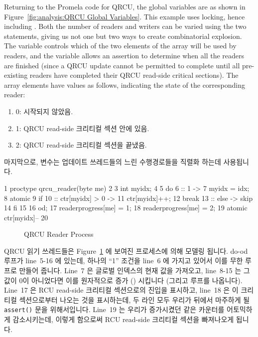 Returning to the Promela code for QRCU, the global variables are as shown in
Figure~\ref{fig:analysis:QRCU Global Variables}.
This example uses locking, hence including .
Both the number of readers and writers can be varied using the
two  statements, giving us not one but two ways to create
combinatorial explosion.
The  variable controls which of the two elements of the 
array will be used by readers, and the  variable
allows an assertion to determine when all the readers are finished
(since a QRCU update cannot be permitted to complete until all
pre-existing readers have completed their QRCU read-side critical
sections).
The  array elements have values as follows,
indicating the state of the corresponding reader:
\fi

\begin{enumerate}
\item	0: 시작되지 않았음.
\item	1: QRCU read-side 크리티컬 섹션 안에 있음.
\item	2: QRCU read-side 크리티컬 섹션을 끝냈음.
\iffalse

\item	0: not yet started.
\item	1: within QRCU read-side critical section.
\item	2: finished with QRCU read-side critical section.
\fi
\end{enumerate}

마지막으로,  변수는 업데이트 쓰레드들의 느린 수행경로들을 직렬화
하는데 사용됩니다.
\iffalse

Finally, the \co{mutex} variable is used to serialize updaters' slowpaths.
\fi

{ \scriptsize
\begin{verbbox}
  1 proctype qrcu_reader(byte me)
  2 {
  3   int myidx;
  4
  5   do
  6   :: 1 ->
  7     myidx = idx;
  8     atomic {
  9       if
 10       :: ctr[myidx] > 0 ->
 11         ctr[myidx]++;
 12         break
 13       :: else -> skip
 14       fi
 15     }
 16   od;
 17   readerprogress[me] = 1;
 18   readerprogress[me] = 2;
 19   atomic { ctr[myidx]-- }
 20 }
\end{verbbox}
}
\begin{figure}[htbp]
\centering
\theverbbox
\caption{QRCU Reader Process}
\label{fig:analysis:QRCU Reader Process}
\end{figure}

QRCU 읽기 쓰레드들은
Figure~\ref{fig:analysis:QRCU Reader Process} 에 보여진 
프로세스에 의해 모델링 됩니다.
do-od 루프가 line~5-16 에 있는데, 하나의 ``1'' 조건을 line~6 에 가지고 있어서
이를 무한 루프로 만들어 줍니다.
Line~7 은 글로벌 인덱스의 현재 값을 가져오고, line~8-15 는 그 값이 0이
아니었다면 이를 원자적으로 증가 () 시킵니다 (그리고
루프를 나옵니다).
Line~17 은 RCU read-side 크리티컬 섹션으로의 진입을 표시하고, line~18 은 이
크리티컬 섹션으로부터 나오는 것을 표시하는데, 두 라인 모두 우리가 뒤에서
마주하게 될 {\tt assert()} 문을 위해서입니다.
Line~19 는 우리가 증가시켰던 같은 카운터를 어토믹하게 감소시키는데, 이렇게
함으로써 RCU read-side 크리티컬 섹션을 빠져나오게 됩니다.
\iffalse

